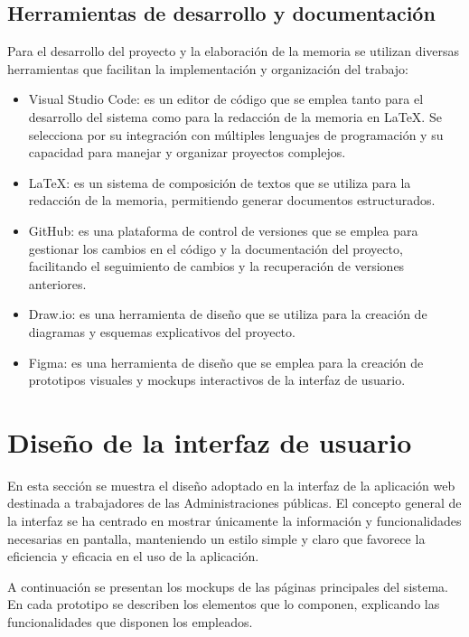     \subsection{Herramientas de desarrollo y documentación}
        Para el desarrollo del proyecto y la elaboración de la memoria se utilizan diversas herramientas que facilitan la implementación y organización del trabajo:
        \begin{itemize}
            \item Visual Studio Code: es un editor de código que se emplea tanto para el desarrollo del sistema como para la redacción de la memoria en LaTeX. 
                Se selecciona por su integración con múltiples lenguajes de programación y su capacidad para manejar y organizar proyectos complejos. 
            \item LaTeX: es un sistema de composición de textos que se utiliza para la redacción de la memoria, permitiendo generar documentos estructurados. 
            \item GitHub: es una plataforma de control de versiones que se emplea para gestionar los cambios en el código y la documentación del proyecto, facilitando el seguimiento de cambios y la recuperación de versiones anteriores. 
            \item Draw.io: es una herramienta de diseño que se utiliza para la creación de diagramas y esquemas explicativos del proyecto.
            \item Figma: es una herramienta de diseño que se emplea para la creación de prototipos visuales y mockups interactivos de la interfaz de usuario. 
        \end{itemize}

\section{Diseño de la interfaz de usuario}
    En esta sección se muestra el diseño adoptado en la interfaz de la aplicación web destinada a trabajadores de las Administraciones públicas.
    El concepto general de la interfaz se ha centrado en mostrar únicamente la información y funcionalidades necesarias en pantalla, manteniendo un estilo simple y claro que favorece la eficiencia y eficacia en el uso de la aplicación.

    A continuación se presentan los mockups de las páginas principales del sistema.
    En cada prototipo se describen los elementos que lo componen, explicando las funcionalidades que disponen los empleados.

